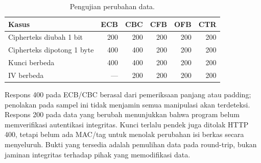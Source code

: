 \begin{table}[htbp]
  \centering\small
  \caption{Pengujian perubahan data.}
  \begin{tabularx}{\linewidth}{@{}Yrrrrr@{}}
    \toprule Kasus & ECB & CBC & CFB & OFB & CTR\\ \midrule
    Cipherteks diubah 1 bit & 200 & 200 & 200 & 200 & 200\\
    Cipherteks dipotong 1 byte & 400 & 400 & 200 & 200 & 200\\
    Kunci berbeda & 400 & 400 & 200 & 200 & 200\\
    IV berbeda & --- & 200 & 200 & 200 & 200\\
    \bottomrule
  \end{tabularx}
\end{table}
Respons 400 pada ECB/CBC berasal dari pemeriksaan panjang atau padding;
penolakan pada sampel ini tidak menjamin semua manipulasi akan terdeteksi.
Respons 200 pada data yang berubah menunjukkan bahwa program belum
memverifikasi autentikasi integritas. Kunci terlalu pendek juga ditolak
HTTP 400, tetapi belum ada MAC/tag untuk menolak perubahan isi berkas
secara menyeluruh. Bukti yang tersedia adalah pemulihan data pada
round-trip, bukan jaminan integritas terhadap pihak yang memodifikasi data.
